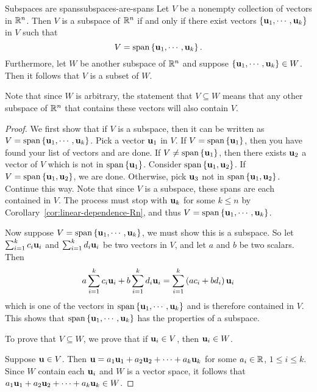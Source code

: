 \begin{theorem}{Subspaces are spans}{subspaces-are-spans}
  Let $V$ be a nonempty collection of vectors in $\mathbb{R}^{n}$. Then $V$ is
  a subspace of $\mathbb{R}^{n}$ if and only if there exist vectors
  $\left\{\mbox{\bf u}_{1},\cdots ,\mbox{\bf u}_{k}\right\}$ in $V$ such that
  \begin{equation*}
    V= \sspan\set{\vect{u}_{1},\cdots ,\vect{u}_{k}}. 
  \end{equation*}
   Furthermore, let $W$ be another subspace of
  $\mathbb{R}^n$ and suppose $\left\{\mbox{\bf u}_{1},\cdots ,\mbox{\bf u}_{k}\right\} \in
  W$. Then it follows that $V$ is a subset of $W$.
\end{theorem}

Note that since $W$ is arbitrary, the statement that $V \subseteq W$
means that any other subspace of $\mathbb{R}^n$ that contains these vectors
will also contain $V$.

\begin{proof}
  We first show that if $V$ is a subspace, then it can be written as
  $V= \sspan\set{\vect{u}_{1},\cdots ,\vect{u}_{k}}$. Pick a vector
  $\mbox{\bf u}_{1}$ in $V$. If $V= \sspan\set{\vect{u}_{1}}$, then you
  have found your list of vectors and are done. If
  $V\neq \sspan\set{\vect{u}_{1}}$, then there exists $\mbox{\bf u}_{2}$ a
  vector of $V$ which is not in $ \sspan\set{\vect{u}_{1}}$. Consider
  $\sspan\set{ \vect{u}_{1},\vect{u}_{2}}$.  If
  $V=\sspan\set{\vect{u}_{1},\vect{u}_{2}}$, we are done. Otherwise,
  pick $\mbox{\bf u}_{3}$ not in
  $\sspan\set{\vect{u}_{1},\vect{u}_{2}}$. Continue this way.  Note
  that since $V $ is a subspace, these spans are each contained in
  $V$.  The process must stop with $\mbox{\bf u}_{k}$ for some $k\leq n$
  by Corollary~\ref{cor:linear-dependence-Rn}, and thus
  $V=\sspan\set{\vect{u}_{1},\cdots , \vect{u}_{k}}$.

  Now suppose $V=\sspan\set{\vect{u}_{1},\cdots , \vect{u}_{k}}$, we
  must show this is a subspace. So let
  $\sum_{i=1}^{k}c_{i}\mbox{\bf u}_{i}$ and
  $ \sum_{i=1}^{k}d_{i}\mbox{\bf u}_{i}$ be two vectors in $V$, and let
  $a$ and $b$ be two scalars. Then
  \begin{equation*}
    a \sum_{i=1}^{k}c_{i}\mbox{\bf u}_{i}+ b \sum_{i=1}^{k}d_{i}\mbox{\bf u}_{i}=
    \sum_{i=1}^{k}\left(a c_{i}+b  d_{i}\right) \mbox{\bf u}_{i}
  \end{equation*}
  which is one of the vectors in
  $\sspan\set{\vect{u}_{1},\cdots , \vect{u}_{k}}$ and is therefore
  contained in $V$. This shows that
  $\sspan\set{\vect{u}_{1},\cdots ,\vect{u}_{k}} $ has the properties
  of a subspace.

  To prove that $V \subseteq W$, we prove that if $\mbox{\bf u}_i\in V$,
  then $\mbox{\bf u}_i \in W$.

  Suppose $\mbox{\bf u}\in V$.  Then
  $\mbox{\bf u}=a_1\mbox{\bf u}_1 + a_2\mbox{\bf u}_2 + \cdots + a_k\mbox{\bf u}_k$
  for some $a_i\in\mathbb{R}$, $1\leq i\leq k$.  Since $W$ contain each
  $\mbox{\bf u}_i$ and $W$ is a vector space, it follows that
  $ a_1\mbox{\bf u}_1 + a_2\mbox{\bf u}_2 + \cdots + a_k\mbox{\bf u}_k \in W$.
\end{proof}

